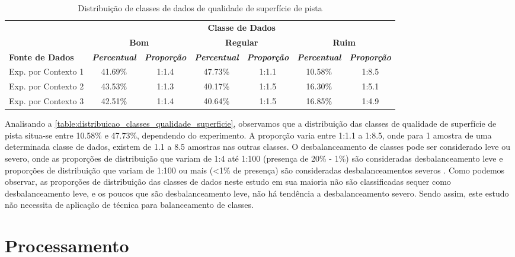 \begin{table}[h]
\caption{Distribuição de classes de dados de qualidade de superfície de pista}
\label{table:distribuicao_classes_qualidade_superficie}
\centering
\scriptsize
\begin{tabular}{lcccccc}
\cmidrule(l){2-7}
\multicolumn{1}{c}{\multirow{2}{*}{\textbf{}}} & 
\multicolumn{6}{c}{\textbf{Classe de Dados}} \\ \cmidrule(l){2-7} 
\multicolumn{1}{c}{} & 
\multicolumn{2}{c}{\textbf{Bom}} & 
\multicolumn{2}{c}{\textbf{Regular}} & 
\multicolumn{2}{c}{\textbf{Ruim}} \\ \midrule
\textbf{Fonte de Dados} & 
\textit{\textbf{Percentual}} & 
\textit{\textbf{Proporção}} & 
\textit{\textbf{Percentual}} & 
\textit{\textbf{Proporção}} & 
\textit{\textbf{Percentual}} & 
\textit{\textbf{Proporção}} \\ \midrule
Exp. por Contexto 1 & 41.69\% & 1:1.4 & 47.73\% & 1:1.1 & 10.58\% & 1:8.5 \\ \midrule
Exp. por Contexto 2 & 43.53\% & 1:1.3 & 40.17\% & 1:1.5 & 16.30\% & 1:5.1 \\ \midrule
Exp. por Contexto 3 & 42.51\% & 1:1.4 & 40.64\% & 1:1.5 & 16.85\% & 1:4.9 \\ \bottomrule
\end{tabular}
\end{table}

Analisando a \autoref{table:distribuicao_classes_qualidade_superficie}, observamos que a distribuição das classes de qualidade de superfície de pista situa-se entre 10.58\% e 47.73\%, dependendo do experimento. A proporção varia entre 1:1.1 a 1:8.5, onde para 1 amostra de uma determinada classe de dados, existem de 1.1 a 8.5 amostras nas outras classes. O desbalanceamento de classes pode ser considerado leve ou severo, onde as proporções de distribuição que variam de 1:4 até 1:100 (presença de 20\% - 1\%) são consideradas desbalanceamento leve e proporções de distribuição que variam de 1:100 ou mais (<1\% de presença) são consideradas desbalanceamentos severos \cite{Krawczyk2016,Brownlee2020}. Como podemos observar, as proporções de distribuição das classes de dados neste estudo em sua maioria não são classificadas sequer como desbalanceamento leve, e os poucos que são desbalanceamento leve, não há tendência a desbalanceamento severo. Sendo assim, este estudo não necessita de aplicação de técnica para balanceamento de classes.

\section{Processamento}

